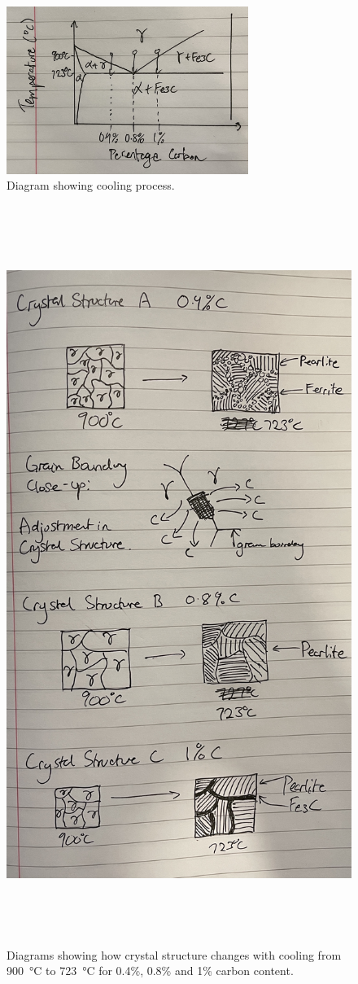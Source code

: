 \documentclass[11pt]{article}
\begin{document}
\begin{figure}[H]
    \centering
    \includegraphics[width = 0.7\textwidth]{./img/q1b.jpg}
    \caption{Diagram showing cooling process.}
\end{figure}
\begin{figure}[H]
    \centering
    \includegraphics[height = 24cm]{./img/q1a.jpg}
    \caption{Diagrams showing how crystal structure changes with cooling from \SI{900}{\celsius} to \SI{723}{\celsius} for 0.4\%, 0.8\% and 1\% carbon content.}
\end{figure}
\end{document}
